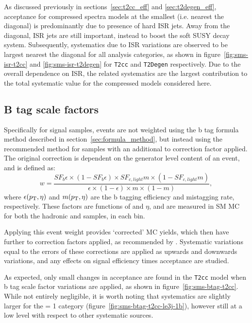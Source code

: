 As discussed previously in sections~\ref{sec:t2cc_eff} and \ref{sec:t2degen_eff},
acceptance for compressed spectra models at the smallest \deltam (i.e. nearest 
the diagonal) is predominantly due to presence of hard ISR jets. Away from the
diagonal, ISR jets are still important, instead to boost 
the soft SUSY decay system. Subsequently, systematics due to ISR variations are 
observed to be largest nearest the diagonal for all analysis categories, as shown in
figure~\ref{fig:sms-isr-t2cc} and \ref{fig:sms-isr-t2degen} for \texttt{T2cc} 
and \texttt{T2Degen} respectively. Due to the overall dependence on ISR, the 
related systematics are the largest contribution to the total systematic value
for the compressed models considered here.


\subsection{B tag scale factors}
Specifically for \FASTSIM signal samples, events are not weighted using the 
b tag formula method described in section~\ref{sec:formula_method}, but instead
using the 
recommended method for \FULLSIM samples with an additional \FULLSIM to \FASTSIM 
correction factor applied. The original correction is dependent on the generator
level content of an event, and is defined as:
% 
\begin{equation}
w = \frac{SF_b \epsilon \times (1-SF_b \epsilon) \times SF_{c,light} m \times (1
-SF_{c,light} m)}{\epsilon \times (1-\epsilon) \times m \times (1-m)} ,
\label{eq:btag_fullsim_weight}
\end{equation}
% 
where $\epsilon({p_{\text T}}, \eta)$ and $m({p_{\text T}}, \eta)$ are the b tagging efficiency and 
mistagging rate, respectively. These factors are functions of \Pt and $\eta$, and
are measured in SM MC for both the hadronic and \mj samples, in each \HT bin.

Applying this event weight provides `corrected' MC yields, which then 
have further \FASTSIM to \FULLSIM correction factors applied, as recommended by
\cite{btagpogtwiki}.
Systematic variations equal to the errors of these corrections are applied as 
upwards and downwards variations, and any effects on signal efficiency times 
acceptance are studied.

As expected, only small changes in acceptance are found in the \texttt{T2cc} 
model when b tag scale factor variations are applied, as shown in
figure~\ref{fig:sms-btag-t2cc}. While not entirely negligible, it is worth 
noting that systematics are slightly larger for the \nb= 1 category
(figure~\ref{fig:sms-btag-t2cc-le3j-1b}), however still at a low level with 
respect to other systematic sources.

